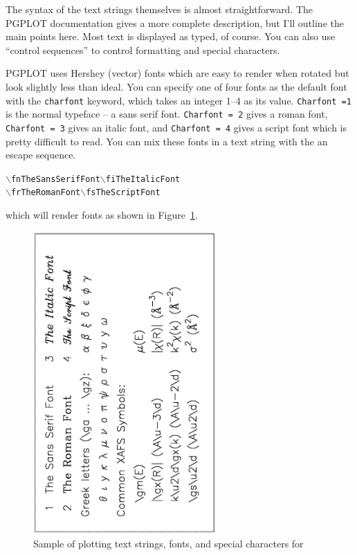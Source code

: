 The syntax of the text strings themselves is almost straightforward.  The
PGPLOT documentation gives a more complete description, but I'll outline
the main points here.  Most text is displayed as typed, of course.  You can
also use ``control sequences'' to control formatting and special
characters.

{}
PGPLOT uses Hershey (vector) fonts which are easy to render when rotated
but look slightly less than ideal.  You can specify one of four fonts as
the default font with the {\texttt{charfont}} keyword, which takes an
integer 1--4 as its value.  {\texttt{Charfont =1}} is the normal typeface
-- a sans serif font.  {\texttt{Charfont = 2}} gives a roman font,
{\texttt{Charfont = 3}} gives an italic font, and {\texttt{Charfont = 4}}
gives a script font which is pretty difficult to read.  You
can mix these fonts in a text string with the an escape sequence.
\begin{alltt}
 \(\backslash\)fn The Sans Serif Font   \(\backslash\)fi The Italic Font
 \(\backslash\)fr The Roman Font    \(\backslash\)fs The Script Font
\end{alltt}
which will render fonts as shown in Figure~\ref{Fig:PlotFonts}.

\begin{figure}[tb] \begin{center}
  \includegraphics[width=2.75in,angle=-90]{figs/plot_fonts.ps}
  \caption{ Sample of plotting text strings, fonts, and special characters
 for {\ifeffit}}\label{Fig:PlotFonts}
\end{center} \end{figure}

